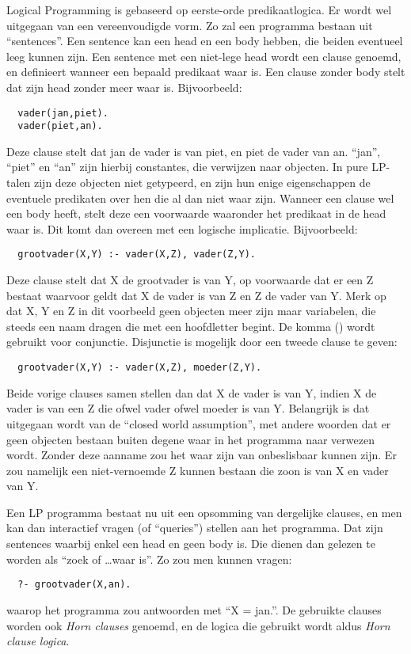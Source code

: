 Logical Programming is gebaseerd op eerste-orde predikaatlogica. Er wordt wel uitgegaan van een vereenvoudigde vorm. Zo zal een programma bestaan uit ``sentences''. Een sentence kan een head en een body hebben, die beiden eventueel leeg kunnen zijn. 
Een sentence met een niet-lege head wordt een clause genoemd, en definieert wanneer een bepaald predikaat waar is. Een clause zonder body stelt dat zijn head zonder meer waar is. Bijvoorbeeld: \begin{Verbatim}
  vader(jan,piet).
  vader(piet,an).
\end{Verbatim}
Deze clause stelt dat jan de vader is van piet, en piet de vader van an. ``jan'', ``piet'' en ``an'' zijn hierbij constantes, die verwijzen naar objecten. In pure LP-talen zijn deze objecten niet getypeerd, en zijn hun enige eigenschappen de eventuele predikaten over hen die al dan niet waar zijn. Wanneer een clause wel een body heeft, stelt deze een voorwaarde waaronder het predikaat in de head waar is. Dit komt dan overeen met een logische implicatie. Bijvoorbeeld: \begin{Verbatim}
  grootvader(X,Y) :- vader(X,Z), vader(Z,Y).
\end{Verbatim}
Deze clause stelt dat X de grootvader is van Y, op voorwaarde dat er een Z bestaat waarvoor geldt dat X de vader is van Z en Z de vader van Y. Merk op dat X, Y en Z in dit voorbeeld geen objecten meer zijn maar variabelen, die steeds een naam dragen die met een hoofdletter begint. De komma (\code{,}) wordt gebruikt voor conjunctie. Disjunctie is mogelijk door een tweede clause te geven: \begin{Verbatim}
  grootvader(X,Y) :- vader(X,Z), moeder(Z,Y).
\end{Verbatim}
Beide vorige clauses samen stellen dan dat X de vader is van Y, indien X de vader is van een Z die ofwel vader ofwel moeder is van Y. Belangrijk is dat uitgegaan wordt van de ``closed world assumption'', met andere woorden dat er geen objecten bestaan buiten degene waar in het programma naar verwezen wordt. Zonder deze aanname zou het waar zijn van  onbeslisbaar kunnen zijn. Er zou namelijk een niet-vernoemde Z kunnen bestaan die zoon is van X en vader van Y.

Een LP programma bestaat nu uit een opsomming van dergelijke clauses, en men kan dan interactief vragen (of ``queries'') stellen aan het programma. Dat zijn sentences waarbij enkel een head en geen body is. Die dienen dan gelezen te worden als ``zoek of \ldots waar is''. Zo zou men kunnen vragen: \begin{Verbatim}
  ?- grootvader(X,an).
\end{Verbatim}
waarop het programma zou antwoorden met ``X = jan.''. De gebruikte clauses worden ook {\em Horn clauses} genoemd, en de logica die gebruikt wordt aldus {\em Horn clause logica}.

